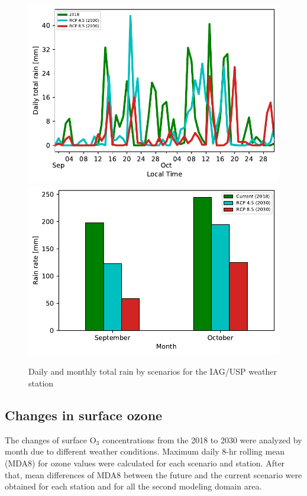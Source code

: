 \begin{figure}[hbt]
  \centering
  \includegraphics{fig/rain_change_iag.pdf}
  \includegraphics{fig/rain_bymonth.pdf}
  \caption{Daily and monthly total rain by scenarios for the IAG/USP weather station}
  \label{fig:rain_change_iag}
\end{figure}

\subsection{Changes in surface ozone}\label{subsec:res_chan_o3}
The changes of surface O$_3$ concentrations from the 2018 to 2030 were analyzed by month due to different weather conditions. 
Maximum daily 8-hr rolling mean (MDA8) for ozone values were calculated for each scenario and station. After that, mean differences of MDA8 between the future and the current scenario were obtained for each station and for all the second modeling domain area.

